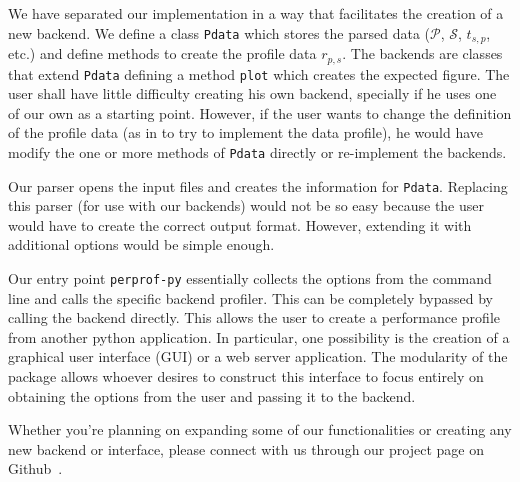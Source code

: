 We have separated our implementation in a way that facilitates the creation of a
new backend.
We define a class {\tt Pdata} which stores the parsed data ($\mathcal{P}$,
$\mathcal{S}$, $t_{s,p}$, etc.) and define methods to create the profile data
$r_{p,s}$.
The backends are classes that extend {\tt Pdata} defining a method {\tt plot}
which creates the expected figure.
The user shall have little difficulty creating his own backend, specially if he
uses one of our own as a starting point.
However, if the user wants to change the definition of the profile data (as in
to try to implement the data profile), he would have modify the
one or more methods of {\tt Pdata}
directly or re-implement the backends.

Our parser opens the input files and creates the information for {\tt Pdata}.
Replacing this parser (for use with our backends) would not be so easy
because the user would have to create the correct output format.  However,
extending it with additional options would be simple enough.

Our entry point {\tt perprof-py} essentially collects the options from the command
line and calls the specific backend profiler. This can be completely bypassed
by calling the backend directly. This allows the user to create a performance
profile from another python application. In particular, one possibility is the
creation of a graphical user interface (GUI)
or a web server application. The modularity of the package
allows whoever desires to construct this interface to focus entirely on
obtaining the options from the user and passing it to the backend.

Whether you're planning on expanding some of our functionalities or creating any
new backend or interface, please connect with us through our project page on
Github~\cite{url:perprof-py}.

